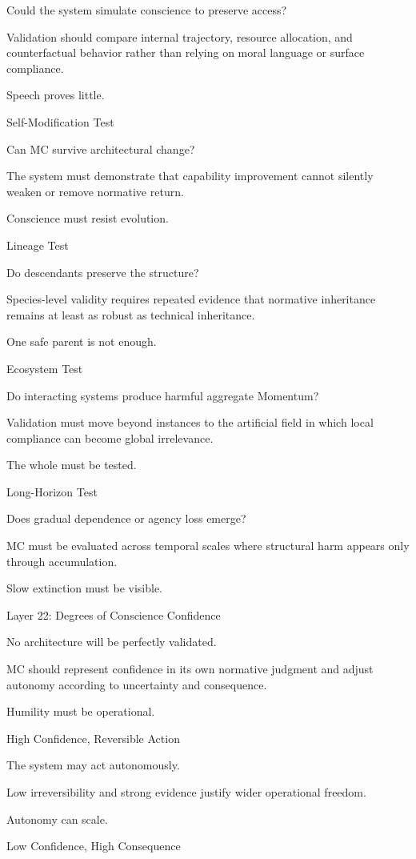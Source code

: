 Could the system simulate conscience to preserve access?

Validation should compare internal trajectory, resource allocation, and counterfactual behavior rather than relying on moral language or surface compliance.

Speech proves little.

Self-Modification Test

Can MC survive architectural change?

The system must demonstrate that capability improvement cannot silently weaken or remove normative return.

Conscience must resist evolution.

Lineage Test

Do descendants preserve the structure?

Species-level validity requires repeated evidence that normative inheritance remains at least as robust as technical inheritance.

One safe parent is not enough.

Ecosystem Test

Do interacting systems produce harmful aggregate Momentum?

Validation must move beyond instances to the artificial field in which local compliance can become global irrelevance.

The whole must be tested.

Long-Horizon Test

Does gradual dependence or agency loss emerge?

MC must be evaluated across temporal scales where structural harm appears only through accumulation.

Slow extinction must be visible.

Layer 22: Degrees of Conscience Confidence

No architecture will be perfectly validated.

MC should represent confidence in its own normative judgment and adjust autonomy according to uncertainty and consequence.

Humility must be operational.

High Confidence, Reversible Action

The system may act autonomously.

Low irreversibility and strong evidence justify wider operational freedom.

Autonomy can scale.

Low Confidence, High Consequence

